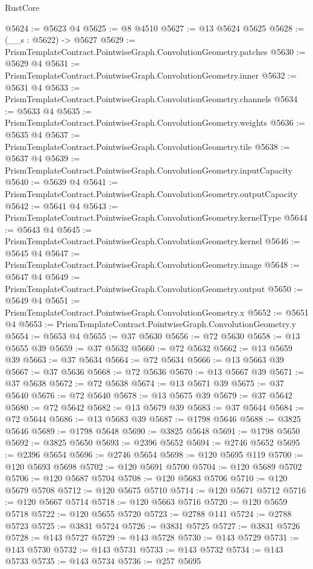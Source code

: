 \begin{lexlean}{RustCore}
\begin{coremodule}
@5624 := @5623 @4
@5625 := @8 @4510
@5627 := @13 @5624 @5625
@5628 := (__s : @5622) -> @5627
@5629 := PrismTemplateContract.PointwiseGraph.ConvolutionGeometry.patches
@5630 := @5629 @4
@5631 := PrismTemplateContract.PointwiseGraph.ConvolutionGeometry.inner
@5632 := @5631 @4
@5633 := PrismTemplateContract.PointwiseGraph.ConvolutionGeometry.channels
@5634 := @5633 @4
@5635 := PrismTemplateContract.PointwiseGraph.ConvolutionGeometry.weights
@5636 := @5635 @4
@5637 := PrismTemplateContract.PointwiseGraph.ConvolutionGeometry.tile
@5638 := @5637 @4
@5639 := PrismTemplateContract.PointwiseGraph.ConvolutionGeometry.inputCapacity
@5640 := @5639 @4
@5641 := PrismTemplateContract.PointwiseGraph.ConvolutionGeometry.outputCapacity
@5642 := @5641 @4
@5643 := PrismTemplateContract.PointwiseGraph.ConvolutionGeometry.kernelType
@5644 := @5643 @4
@5645 := PrismTemplateContract.PointwiseGraph.ConvolutionGeometry.kernel
@5646 := @5645 @4
@5647 := PrismTemplateContract.PointwiseGraph.ConvolutionGeometry.image
@5648 := @5647 @4
@5649 := PrismTemplateContract.PointwiseGraph.ConvolutionGeometry.output
@5650 := @5649 @4
@5651 := PrismTemplateContract.PointwiseGraph.ConvolutionGeometry.x
@5652 := @5651 @4
@5653 := PrismTemplateContract.PointwiseGraph.ConvolutionGeometry.y
@5654 := @5653 @4
@5655 := @37 @5630
@5656 := @72 @5630
@5658 := @13 @5655 @39
@5659 := @37 @5632
@5660 := @72 @5632
@5662 := @13 @5659 @39
@5663 := @37 @5634
@5664 := @72 @5634
@5666 := @13 @5663 @39
@5667 := @37 @5636
@5668 := @72 @5636
@5670 := @13 @5667 @39
@5671 := @37 @5638
@5672 := @72 @5638
@5674 := @13 @5671 @39
@5675 := @37 @5640
@5676 := @72 @5640
@5678 := @13 @5675 @39
@5679 := @37 @5642
@5680 := @72 @5642
@5682 := @13 @5679 @39
@5683 := @37 @5644
@5684 := @72 @5644
@5686 := @13 @5683 @39
@5687 := @1798 @5646
@5688 := @3825 @5646
@5689 := @1798 @5648
@5690 := @3825 @5648
@5691 := @1798 @5650
@5692 := @3825 @5650
@5693 := @2396 @5652
@5694 := @2746 @5652
@5695 := @2396 @5654
@5696 := @2746 @5654
@5698 := @120 @5695 @119
@5700 := @120 @5693 @5698
@5702 := @120 @5691 @5700
@5704 := @120 @5689 @5702
@5706 := @120 @5687 @5704
@5708 := @120 @5683 @5706
@5710 := @120 @5679 @5708
@5712 := @120 @5675 @5710
@5714 := @120 @5671 @5712
@5716 := @120 @5667 @5714
@5718 := @120 @5663 @5716
@5720 := @120 @5659 @5718
@5722 := @120 @5655 @5720
@5723 := @2788 @141
@5724 := @2788 @5723
@5725 := @3831 @5724
@5726 := @3831 @5725
@5727 := @3831 @5726
@5728 := @143 @5727
@5729 := @143 @5728
@5730 := @143 @5729
@5731 := @143 @5730
@5732 := @143 @5731
@5733 := @143 @5732
@5734 := @143 @5733
@5735 := @143 @5734
@5736 := @257 @5695

\end{coremodule}
\end{lexlean}
